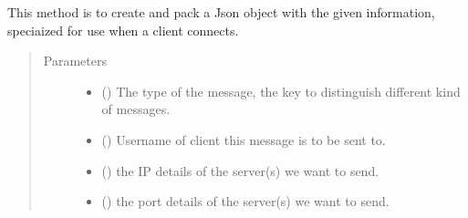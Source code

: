\documentclass[letterpaper,10pt,english]{sphinxmanual}
\begin{document}

\begin{fulllineitems}
\label{\detokenize{balancerHelper:balancerHelper.packJSONConnClient}}
This method is to create and pack a Json object with the given information, speciaized for use when a client connects.
\begin{quote}\begin{description}
\item[{Parameters}] \leavevmode\begin{itemize}
\item {} 
 () \textendash{} The type of the message, the key to distinguish different kind of messages.

\item {} 
 () \textendash{} Username of client this message is to be sent to.

\item {} 
 (\sphinxstyleliteralemphasis{\sphinxupquote{, }}) \textendash{} the IP details of the server(s) we want to send.

\item {} 
 (\sphinxstyleliteralemphasis{\sphinxupquote{, }}) \textendash{} the port details of the server(s) we want to send.

\end{itemize}

\end{description}\end{quote}

\end{fulllineitems}

\end{document}
